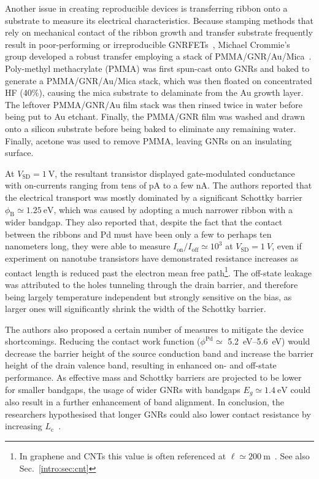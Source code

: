 Another issue in creating reproducible devices is transferring ribbon onto a substrate to measure its electrical characteristics. Because stamping methods that rely on mechanical contact of the ribbon growth and transfer substrate frequently result in poor-performing or irreproducible \glspl{GNRFET}~\cite{cai2010atomically}, Michael Crommie's group developed a robust transfer employing a stack of PMMA/\gls{GNR}/Au/Mica~\cite{Bennett2013}. Poly-methyl methacrylate (PMMA) was first spun-cast onto \glspl{GNR} and baked to generate a PMMA/GNR/Au/Mica stack, which was then floated on concentrated HF (40\%), causing the mica substrate to delaminate from the Au growth layer. The leftover PMMA/GNR/Au film stack was then rinsed twice in water before being put to Au etchant. Finally, the PMMA/GNR film was washed and drawn onto a silicon substrate before being baked to eliminate any remaining water. Finally, acetone was used to remove PMMA, leaving GNRs on an insulating surface.

At $V_\textrm{SD}=\SI{1}{\volt}$, the resultant transistor displayed gate-modulated conductance with on-currents ranging from tens of pA to a few nA. The authors reported that the electrical transport was mostly dominated by a significant Schottky barrier $\phi_\textrm{B}\simeq\SI{1.25}{\electronvolt}$, which was caused by adopting a much narrower ribbon with a wider bandgap. They also reported that, despite the fact that the contact between the ribbons and Pd must have been only a few to perhaps ten nanometers long, they were able to measure $I_\textrm{on}/I_\textrm{off}\simeq 10^3$ at $V_\textrm{SD} = \SI{1}{V}$, even if experiment on nanotube transistors have demonstrated resistance increases as contact length is reduced past the electron mean free path\footnote[4]{In graphene and \glspl{CNT} this value is often referenced at $\ell\simeq\SI{200}{\metre}$~\cite{xia2011origins, franklin2010length}. See also Sec.~\ref{intro:sec:cnt}}. The off-state leakage was attributed to the holes tunneling through the drain barrier, and therefore being largely temperature independent but strongly sensitive on the bias, as larger ones will significantly shrink the width of the Schottky barrier.

The authors also proposed a certain number of measures to mitigate the device shortcomings. Reducing the contact work function ($\phi^\textrm{Pd}\simeq$ \SIrange{5.2}{5.6}{\electronvolt}) would decrease the barrier height of the source conduction band and increase the barrier height of the drain valence band, resulting in enhanced on- and off-state performance. As effective mass and Schottky barriers are projected to be lower for smaller bandgaps, the usage of wider GNRs with bandgaps $E_g \simeq \SI{1.4}{\electronvolt}$ could also result in a further enhancement of band alignment. In conclusion, the researchers hypothesised that longer GNRs could also lower contact resistance by increasing $L_\textrm{c}$~\cite{wang2017precision}.

